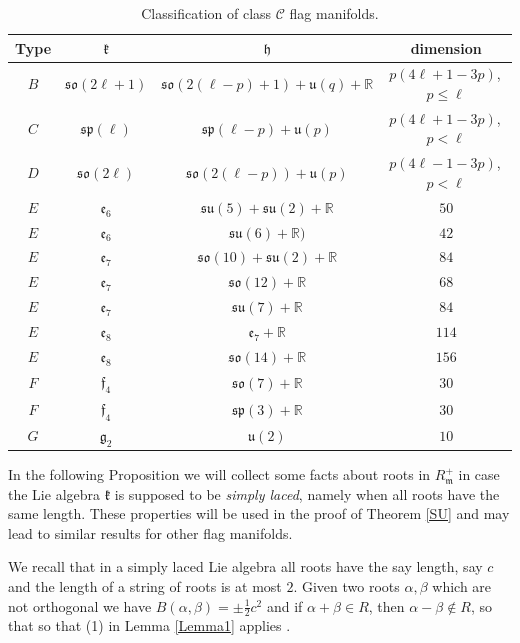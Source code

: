 \documentclass{amsart}
\numberwithin{equation}{section}
\theoremstyle{definition}
\renewcommand{\1}{\mathds{1}}
\renewcommand{\a}{\alpha}
\renewcommand{\b}{\beta}
\renewcommand{\gg}{\mathfrak g}
\newcommand{\gk}{\mathfrak k}
\newcommand{\gh}{\mathfrak h}
\newcommand{\gm}{\mathfrak m}
\newcommand{\so}{\mathfrak{so}}
\newcommand{\su}{\mathfrak{su}}
\renewcommand{\>}{\rightarrow}
\begin{document}
\begin{table}[ht]\label{T1}
	\centering
	\renewcommand\arraystretch{1.1}
	\begin{tabular}{|c|c|c|c|}
		\hline
		{\mbox{Type}}				& 	$\gk$					&	$\gh$	& 	{\mbox{dimension}}			 	\\ \hline \hline
	$B$ &	$\so(2\ell +1)$ & $\so(2(\ell-p)+1) + {\mathfrak u}(q) +\mathbb R$ & $p(4\ell+1-3p)$,\, $p\leq \ell$				\\ \hline
	$C$ & ${\mathfrak {sp}}(\ell)$ & ${\mathfrak {sp}}(\ell-p) + {\mathfrak u}(p)$ & $p(4\ell+1-3p)$,\, $p< \ell$			\\ \hline
	$D$ & $\so(2\ell)$ & $\so(2(\ell-p)) + \mathfrak u(p)$ & $p(4\ell-1-3p)$,\, $p< \ell$			\\ \hline
	$E$ & $\mathfrak e_6$ & $\su(5)+\su(2)+\mathbb R$ & $50$			\\ \hline
	$E$ & $\mathfrak e_6$ & $\su(6)+\mathbb R)$ & $42$			\\ \hline
	$E$ & $\mathfrak e_7$ & $\so(10)+\su(2)+\mathbb R$ & $84$			\\ \hline
	$E$ & $\mathfrak e_7$ & $\so(12)+\mathbb R$ & $68$			\\ \hline
	$E$ & $\mathfrak e_7$ & $\su(7)+\mathbb R$ & $84$			\\ \hline
	$E$ & $\mathfrak e_8$ & $\mathfrak e_7+\mathbb R$ & $114$			\\ \hline
	$E$ & $\mathfrak e_8$ & $\so(14)+\mathbb R$ & $156$			\\ \hline
	$F$ & $\mathfrak f_4$ & $\so(7)+\mathbb R$ & $30$			\\ \hline
	$F$ & $\mathfrak f_4$ & $\mathfrak{sp}(3)+\mathbb R$ & $30$			\\ \hline
	$G$ & $\gg_2$ & $\mathfrak u(2)$ & $10$			\\ \hline
	\end{tabular}
	\vspace{0.1cm}
	\caption{Classification of class $\mathcal C$ flag manifolds.\phantom\qquad\qquad \qquad \qquad \qquad }\label{table}
\end{table}

In the following Proposition we will collect some facts about roots in $R_\gm^+$ in case the Lie algebra $\gk$ is supposed to be {\em simply laced}, namely when all roots have the same length. These properties will be used in the proof of Theorem \ref{SU} and may lead to similar results for other flag manifolds.\par
We recall that in a simply laced Lie algebra all roots have the say length, say $c$ and the length of a string of roots is at most $2$. Given two roots $\a,\b$ which are not orthogonal we have $B(\a,\b)=\pm \frac 12 c^2$ and if $\a+\b\in R$, then $\a-\b\not\in R$, so that  so that (1) in Lemma \ref{Lemma1} applies .
\end{document}
